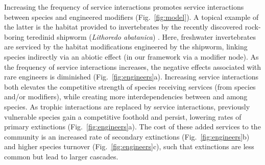\documentclass[twocolumn,preprintnumbers,amsmath,amssymb,superscriptaddress,linenumbers]{revtex4-1}
\begin{document}
Increasing the frequency of service interactions promotes service interactions between species and engineered modifiers (Fig.\ \ref{fig:model}).
A topical example of the latter is the habitat provided to invertebrates by the recently discovered rock-boring teredinid shipworm (\emph{Lithoredo abatanica}) \cite{Shipway2019}.
Here, freshwater invertebrates are serviced by the habitat modifications engineered by the shipworm, linking species indirectly via an abiotic effect (in our framework via a modifier node).
As the frequency of service interactions increases, the negative effects associated with rare engineers is diminished (Fig.\ \ref{fig:engineers}a).
Increasing service interactions both elevates the competitive strength of species receiving services (from species and/or modifiers), while creating more interdependencies between and among species.
As trophic interactions are replaced by service interactions, previously vulnerable species gain a competitive foothold and persist, lowering rates of primary extinctions (Fig.\ \ref{fig:engineers}a). %
The cost of these added services to the community is an increased rate of secondary extinctions (Fig.\ \ref{fig:engineers}b) and higher species turnover (Fig.\ \ref{fig:engineers}c), such that extinctions are less common but lead to larger cascades.



\end{document}
